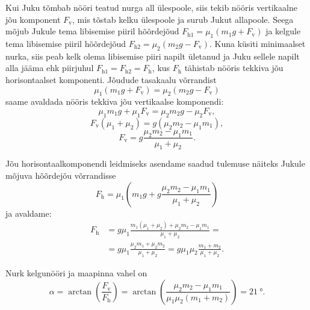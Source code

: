 \documentclass[11pt]{article}
\begin{document}
{{Kui Juku tõmbab nööri teatud nurga all ülespoole, siis tekib nööris vertikaalne jõu komponent $F_{\mathrm{v}}$, mis tõstab kelku ülespoole ja surub Jukut allapoole. Seega mõjub Jukule tema libisemise piiril hõõrdejõud $F_{\mathrm{h}1} = \mu_1 \left(m_1 g + F_{\mathrm{v}}\right)$ ja kelgule tema libisemise piiril hõõrdejõud $F_{\mathrm{h}2} = \mu_2 \left(m_2 g - F_{\mathrm{v}}\right)$. Kuna küsiti minimaalset nurka, siis peab kelk olema libisemise piiri napilt ületanud ja Juku sellele napilt alla jääma ehk piirjuhul $F_{\mathrm{h}1} = F_{\mathrm{h}2} = F_{\mathrm{h}}$, kus $F_{\mathrm{h}}$ tähistab nööris tekkiva jõu horisontaalset komponenti.
Jõudude tasakaalu võrrandist
\begin{equation*}
\mu_1 \left(m_1 g + F_{\mathrm{v}}\right) = \mu_2 \left(m_2 g - F_{\mathrm{v}}\right)
\end{equation*}
saame avaldada nööris tekkiva jõu vertikaalse komponendi:
\begin{equation*}
\mu_1 m_1 g + \mu_1 F_{\mathrm{v}} = \mu_2 m_2 g - \mu_2 F_{\mathrm{v}},
\end{equation*}
\begin{equation*}
F_{\mathrm{v}} \left(\mu_1 + \mu_2\right) = g\left(\mu_2 m_2 - \mu_1 m_1\right),
\end{equation*}
\begin{equation*}
F_{\mathrm{v}} = g\frac{\mu_2 m_2 - \mu_1 m_1}{\mu_1 + \mu_2}.
\end{equation*}

Jõu horisontaalkomponendi leidmiseks asendame saadud tulemuse näiteks Jukule mõjuva hõõrdejõu võrrandisse
\begin{equation*}
F_{\mathrm{h}} = \mu_1 \left(m_1 g + g\frac{\mu_2 m_2 - \mu_1 m_1}{\mu_1 + \mu_2}\right)
\end{equation*}
ja avaldame:
\begin{align*}
F_{\mathrm{h}} &= g \mu_1 \frac{m_1 \left(\mu_1 + \mu_2\right) + \mu_2 m_2 - \mu_1 m_1}{\mu_1 + \mu_2} = \\
&= g \mu_1 \frac{\mu_2 m_1 + \mu_2 m_2}{\mu_1 + \mu_2} = g\mu_1\mu_2\frac{m_1+m_2}{\mu_1+\mu_2}.
\end{align*}

Nurk kelgunööri ja maapinna vahel on
\begin{equation*}
\alpha = \arctan\left(\frac{F_{\mathrm{v}}}{F_{\mathrm{h}}}\right) = \arctan\left(\frac{\mu_2 m_2 - \mu_1 m_1}{\mu_1 \mu_2 \left(m_1 + m_2\right)}\right) = \SI{21}{\degree}.
\end{equation*}
\fi
}

}
\end{document}
